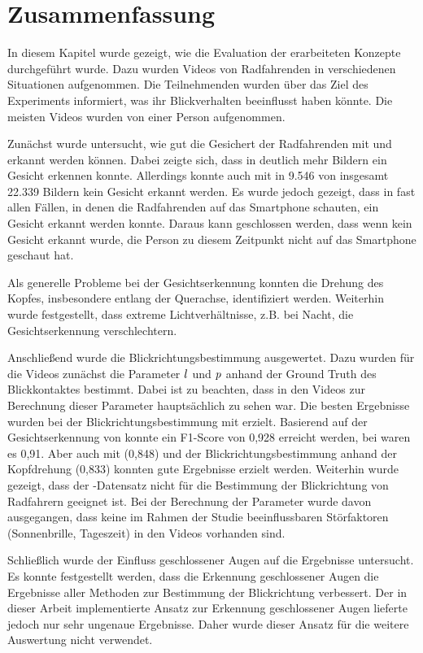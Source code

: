 \section{Zusammenfassung}

In diesem Kapitel wurde gezeigt, wie die Evaluation der erarbeiteten Konzepte durchgeführt wurde. Dazu wurden Videos von Radfahrenden in verschiedenen Situationen aufgenommen. Die Teilnehmenden wurden über das Ziel des Experiments informiert, was ihr Blickverhalten beeinflusst haben könnte. Die meisten Videos wurden von einer Person aufgenommen.

Zunächst wurde untersucht, wie gut die Gesichert der Radfahrenden mit \mediapipe und \dlib   erkannt werden können. Dabei zeigte sich, dass \mediapipe in deutlich mehr Bildern ein Gesicht erkennen konnte. Allerdings konnte auch mit \mediapipe in 9.546 von insgesamt 22.339 Bildern kein Gesicht erkannt werden. Es wurde jedoch gezeigt, dass in fast allen Fällen, in denen die Radfahrenden auf das Smartphone schauten, ein Gesicht erkannt werden konnte. Daraus kann geschlossen werden, dass wenn kein Gesicht erkannt wurde, die Person zu diesem Zeitpunkt nicht auf das Smartphone geschaut hat.

Als generelle Probleme bei der Gesichtserkennung konnten die Drehung des Kopfes, insbesondere entlang der Querachse, identifiziert werden. Weiterhin wurde festgestellt, dass extreme Lichtverhältnisse, z.B. bei Nacht, die Gesichtserkennung verschlechtern. 

Anschließend wurde die Blickrichtungsbestimmung ausgewertet. Dazu wurden für die Videos zunächst die Parameter $l$ und $p$ anhand der Ground Truth des Blickkontaktes bestimmt.  Dabei ist zu beachten, dass in den Videos zur Berechnung dieser Parameter hauptsächlich \markus zu sehen war. Die besten Ergebnisse wurden bei der Blickrichtungsbestimmung mit \ethg erzielt. Basierend auf der Gesichtserkennung von \mediapipe konnte ein F1-Score von 0,928 erreicht werden, bei \dlib waren es 0,91. Aber auch mit \gazed (0,848) und der Blickrichtungsbestimmung anhand der Kopfdrehung (0,833) konnten gute Ergebnisse erzielt werden. Weiterhin wurde gezeigt, dass der \mpii-Datensatz \cite{paper:mpiifacegaze} nicht für die Bestimmung der Blickrichtung von Radfahrern geeignet ist. Bei der Berechnung der Parameter wurde davon ausgegangen, dass keine im Rahmen der Studie beeinflussbaren Störfaktoren (Sonnenbrille, Tageszeit) in den Videos vorhanden sind.

Schließlich wurde der Einfluss geschlossener Augen auf die Ergebnisse untersucht. Es konnte festgestellt werden, dass die Erkennung geschlossener Augen die Ergebnisse aller Methoden zur Bestimmung der Blickrichtung verbessert. Der in dieser Arbeit implementierte Ansatz zur Erkennung geschlossener Augen lieferte jedoch nur sehr ungenaue Ergebnisse. Daher wurde dieser Ansatz für die weitere Auswertung nicht verwendet.












